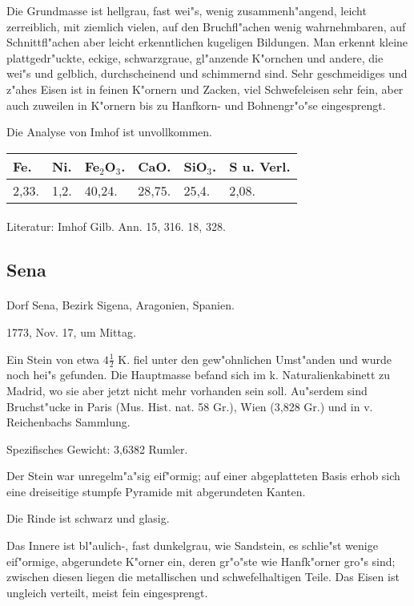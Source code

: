 \documentclass[a4paper, 11pt, oneside]{article}
\begin{document}
Die Grundmasse ist hellgrau, fast wei"s, wenig zusammenh"angend, leicht zerreiblich, mit ziemlich vielen, auf den Bruchfl"achen wenig wahrnehmbaren, auf Schnittfl"achen aber leicht erkenntlichen kugeligen Bildungen. Man erkennt kleine plattgedr"uckte, eckige, schwarzgraue, gl"anzende K"ornchen und andere, die wei"s und gelblich, durchscheinend und schimmernd sind. Sehr geschmeidiges und z"ahes Eisen ist in feinen K"ornern und Zacken, viel Schwefeleisen sehr fein, aber auch zuweilen in K"ornern bis zu Hanfkorn- und Bohnengr"o"se eingesprengt.

Die Analyse von Imhof ist unvollkommen.
\begin{table}[!ht]
    \centering
    \begin{tabular}{l l l l l l}
        Fe. & Ni. & Fe$_{2}$O$_{3}$. & CaO. & SiO$_{3}$. & S u. Verl.\\\hline
        2,33. & 1,2. & 40,24. & 28,75. & 25,4. & 2,08. \\
    \end{tabular}
\end{table}
\footnotesize
\paragraph{}
Literatur: Imhof Gilb. Ann. 15, 316. 18, 328.
\subsection{Sena}
\normalsize
\paragraph{}
Dorf Sena, Bezirk Sigena, Aragonien, Spanien.

1773, Nov. 17, um Mittag.

Ein Stein von etwa $4\frac{1}{2}$ K. fiel unter den gew"ohnlichen Umst"anden und wurde noch hei"s gefunden. Die Hauptmasse befand sich im k. Naturalienkabinett zu Madrid, wo sie aber jetzt nicht mehr vorhanden sein soll. Au"serdem sind Bruchst"ucke in Paris (Mus. Hist. nat. 58 Gr.), Wien (3,828 Gr.) und in v. Reichenbachs Sammlung.

Spezifisches Gewicht: 3,6382 Rumler.

Der Stein war unregelm"a"sig eif"ormig; auf einer abgeplatteten Basis erhob sich eine dreiseitige stumpfe Pyramide mit abgerundeten Kanten.

Die Rinde ist schwarz und glasig.

Das Innere ist bl"aulich-, fast dunkelgrau, wie Sandstein, es schlie"st wenige eif"ormige, abgerundete K"orner ein, deren gr"o"ste wie Hanfk"orner gro"s sind; zwischen diesen liegen die metallischen und schwefelhaltigen Teile. Das Eisen ist ungleich verteilt, meist fein eingesprengt.
\end{document}
